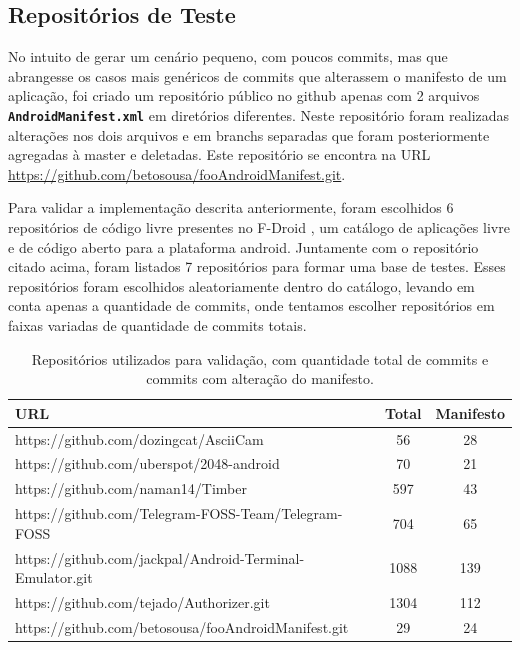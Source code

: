 \documentclass[a4paper,12pt]{article}
\begin{document}
{%
\subsection{Repositórios de Teste}%
\label{sec:repoteste}

No intuito de gerar um cenário pequeno, com poucos commits, mas que abrangesse os casos mais genéricos de commits que alterassem o manifesto de um aplicação, foi criado um repositório público no github apenas com 2 arquivos {\small\texttt{\textbf{AndroidManifest.xml}}} em diretórios diferentes. Neste repositório foram realizadas alterações nos dois arquivos e em branchs separadas que foram posteriormente agregadas à master e deletadas. Este repositório se encontra na URL {\fontsize{10pt}{12pt}\url{https://github.com/betosousa/fooAndroidManifest.git}}.

Para validar a implementação descrita anteriormente, foram escolhidos 6 repositórios de código livre presentes no F-Droid \cite{fdroid}, um catálogo de aplicações livre e de código aberto para a plataforma android. Juntamente com o repositório citado acima, foram listados 7 repositórios para formar uma base de testes. Esses repositórios foram escolhidos aleatoriamente dentro do catálogo, levando em conta apenas a quantidade de commits, onde tentamos escolher repositórios em faixas variadas de quantidade de commits totais.


\begin{table}[h]
\begin{center}
\begin{tabular}{l|c|c}

 URL & Total & Manifesto\\
\hline
https://github.com/dozingcat/AsciiCam & 56 & 28 \\
https://github.com/uberspot/2048-android & 70 & 21 \\
https://github.com/naman14/Timber & 597 & 43 \\
https://github.com/Telegram-FOSS-Team/Telegram-FOSS & 704 & 65 \\
https://github.com/jackpal/Android-Terminal-Emulator.git & 1088 & 139 \\
https://github.com/tejado/Authorizer.git & 1304 & 112 \\
https://github.com/betosousa/fooAndroidManifest.git & 29 & 24
\end{tabular}
\caption{Repositórios utilizados para validação, com quantidade total de commits e commits com alteração do manifesto.}
\end{center}
\end{table}

}
\end{document}
